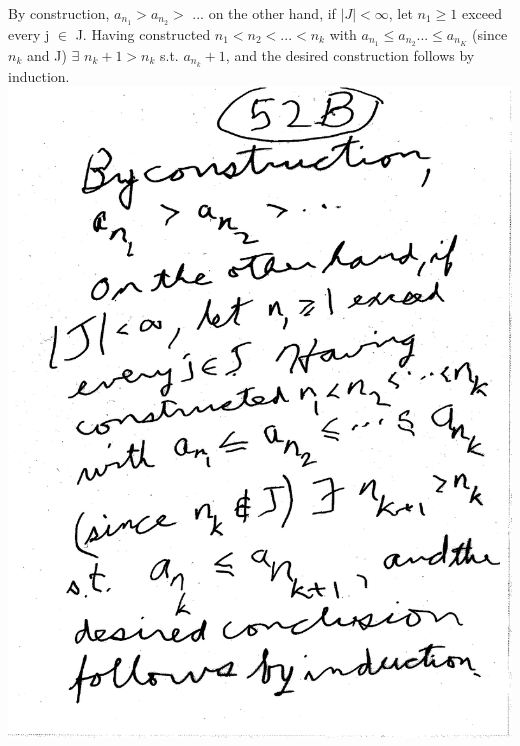 \documentclass[10pt,a4paper]{article}
\begin{document}
{{\newpage
By construction, $a_{n_{1}} > a_{n_{2}} >$ ... on the other hand, if $|J| < \infty$, let $n_1 \geq 1$ exceed every j $\in$ J. Having constructed $n_1 < n_2 < ... < n_k$ with $a_{n_{1}} \leq a_{n_{2}} ... \leq a_{n_{K}}$ (since $n_k$ and J) $\exists$ $n_k + 1 > n_k$ s.t. $a_{n_{k}} + 1$, and the desired construction follows by induction.
\includegraphics[scale=.5]{Pages/LC_8}

}}
\end{document}
